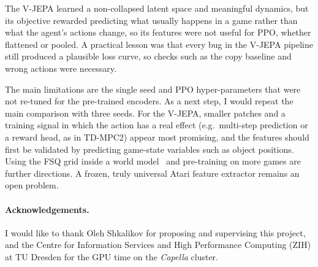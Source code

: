 \documentclass[runningheads]{llncs}
\begin{document}
The V-JEPA learned a non-collapsed latent space and meaningful dynamics, but its objective
rewarded predicting what usually happens in a game rather than what the agent's actions change,
so its features were not useful for PPO, whether flattened or pooled. A practical lesson was that every bug in the V-JEPA pipeline still produced a plausible loss
curve, so checks such as the copy baseline and wrong actions were necessary.

The main limitations are the single seed and PPO hyper-parameters that were not re-tuned for
the pre-trained encoders. As a next step, I would repeat the main comparison with three seeds.
For the V-JEPA, smaller patches and a training signal in which the
action has a real effect (e.g.\ multi-step prediction or a reward head, as in TD-MPC2) appear
most promising, and the features should first be validated by predicting game-state variables
such as object positions. Using the FSQ grid inside a world
model~\cite{hafner2021dreamerv2,micheli2023iris} and pre-training on more games are further
directions. A frozen, truly universal Atari feature extractor remains an open problem.

\paragraph{Acknowledgements.}
I would like to thank Oleh Shkalikov for proposing and supervising this project, and the
Centre for Information Services and High Performance Computing (ZIH) at TU Dresden for the GPU
time on the \emph{Capella} cluster.



\end{document}
